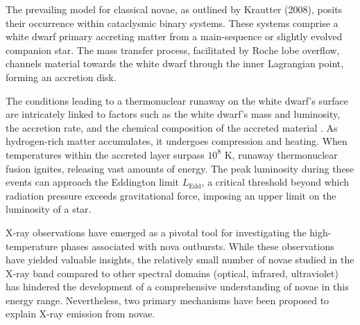 			The prevailing model for classical novae, as outlined by Krautter (2008), posits their occurrence within cataclysmic binary systems. These systems comprise a white dwarf primary accreting matter from a main-sequence or slightly evolved companion star. The mass transfer process, facilitated by Roche lobe overflow, channels material towards the white dwarf through the inner Lagrangian point, forming an accretion disk.
			
			The conditions leading to a thermonuclear runaway on the white dwarf's surface are intricately linked to factors such as the white dwarf's mass and luminosity, the accretion rate, and the chemical composition of the accreted material \cite{starrfield89}. As hydrogen-rich matter accumulates, it undergoes compression and heating. When temperatures within the accreted layer surpass $10^8$ K, runaway thermonuclear fusion ignites, releasing vast amounts of energy. The peak luminosity during these events can approach the Eddington limit $L_\text{Edd}$, a critical threshold beyond which radiation pressure exceeds gravitational force, imposing an upper limit on the luminosity of a star.
			
			X-ray observations have emerged as a pivotal tool for investigating the high-temperature phases associated with nova outbursts.
 While these observations have yielded valuable insights, the relatively small number of novae studied in the X-ray band compared to other spectral domains (optical, infrared, ultraviolet) has hindered the development of a comprehensive understanding of novae in this energy range. Nevertheless, two primary mechanisms have been proposed to explain X-ray emission from novae.
			
